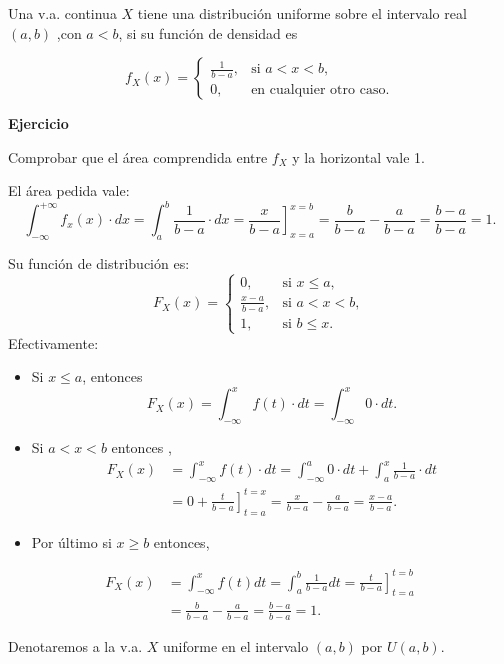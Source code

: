 \documentclass[
  letterpaper,
  DIV=11,
  numbers=noendperiod]{scrreprt}
\providecommand{\tightlist}{%
  \setlength{\itemsep}{0pt}\setlength{\parskip}{0pt}}\usepackage{longtable,booktabs,array}
\begin{document}
Una v.a. continua \(X\) tiene una distribución uniforme sobre el
intervalo real \((a,b)\) ,con \(a<b\), si su función de densidad es

\[
f_X(x)=\left\{\begin{array}{ll}
\frac1{b-a}, & \mbox{si } a<x<b,\\ 0,  & \mbox{en cualquier otro caso.}
\end{array}
\right. 
\]

\textbf{Ejercicio}

Comprobar que el área comprendida entre \(f_X\) y la horizontal vale 1.

El área pedida vale: \[
\int_{-\infty}^{+\infty} f_x(x)\cdot dx=\int_{a}^{b} \frac{1}{b-a} \cdot dx=\left.\frac{x}{b-a}\right]_{x=a}^{x=b}=\frac{b}{b-a}-\frac{a}{b-a}=
\frac{b-a}{b-a}=1.
\]

Su función de distribución es: \[
F_X(x)=\left\{\begin{array}{ll} 0,  & \mbox{si } x\leq a,\\
\frac{x-a}{b-a}, & \mbox{si } a<x<b,\\ 1,  & \mbox{si } b\leq x.
\end{array}
\right. 
\] Efectivamente:

\begin{itemize}
\tightlist
\item
  Si \(x\leq a\), entonces
  \[F_X(x)=\int_{-\infty}^{x} f(t)\cdot dt= \int_{-\infty}^{x} 0\cdot dt.\]
\item
  Si \(a<x<b\) entonces , \[
  \begin{array}{rl}
  F_X(x)&=\displaystyle\int_{-\infty}^{x} f(t)\cdot dt= \int_{-\infty}^{a} 0\cdot dt+\int_{a}^{x} \frac1{b-a} \cdot dt\\
  &= \displaystyle 0 +\left.\frac{t}{b-a}\right]_{t=a}^{t=x}= \frac{x}{b-a}-\frac{a}{b-a}=\frac{x-a}{b-a}.
  \end{array}
  \]
\item
  Por último si \(x\geq b\) entonces,
\end{itemize}

\[
\begin{array}{rl}
F_X(x)&=\displaystyle\int_{-\infty}^{x} f(t) dt=\int_{a}^{b} \frac{1}{b-a} dt=
  \left.  \frac{t}{b-a} \right]_{t=a}^{t=b}
\\&=\displaystyle \frac{b}{b-a}-\frac{a}{b-a}=\frac{b-a}{b-a}=1.
\end{array}
\]

Denotaremos a la v.a. \(X\) uniforme en el intervalo \((a,b)\) por
\(U(a,b)\).
\end{document}
